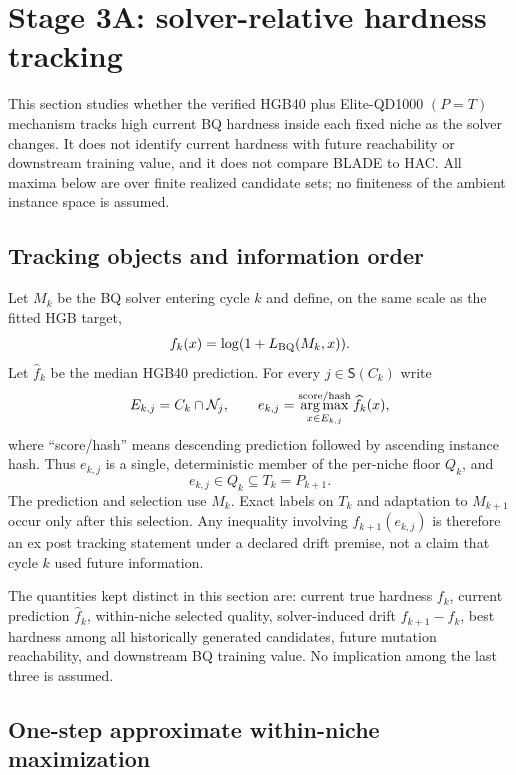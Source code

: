 \section{Stage 3A: solver-relative hardness tracking}
\label{sec:hardness-tracking}

This section studies whether the verified HGB40 plus Elite-QD1000
$(P=T)$ mechanism tracks high current BQ hardness inside each fixed niche as
the solver changes.  It does not identify current hardness with future
reachability or downstream training value, and it does not compare BLADE to
HAC.  All maxima below are over finite realized candidate sets; no finiteness
of the ambient instance space is assumed.

\subsection{Tracking objects and information order}
Let $M_k$ be the BQ solver entering cycle $k$ and define, on the same scale as
the fitted HGB target,
\[
 f_k(x)=\log(1+L_{\rm BQ}(M_k,x)).
\]
Let $\widehat f_k$ be the median HGB40 prediction.  For every
$j\in\mathsf S(C_k)$ write
\[
 E_{k,j}=C_k\cap\mathcal N_j,
 \qquad
 e_{k,j}=\mathop{\arg\max}_{x\in E_{k,j}}^{\rm score/hash}
                 \widehat f_k(x),
\]
where ``score/hash'' means descending prediction followed by ascending
instance hash.  Thus $e_{k,j}$ is a single, deterministic member of the
per-niche floor $Q_k$, and
\[
 e_{k,j}\in Q_k\subseteq T_k=P_{k+1}.
\]
The prediction and selection use $M_k$.  Exact labels on $T_k$ and adaptation
to $M_{k+1}$ occur only after this selection.  Any inequality involving
$f_{k+1}(e_{k,j})$ is therefore an ex post tracking statement under a declared
drift premise, not a claim that cycle $k$ used future information.

The quantities kept distinct in this section are: current true hardness
$f_k$, current prediction $\widehat f_k$, within-niche selected quality,
solver-induced drift $f_{k+1}-f_k$, best hardness among all historically
generated candidates, future mutation reachability, and downstream BQ
training value.  No implication among the last three is assumed.

\subsection{One-step approximate within-niche maximization}
 

